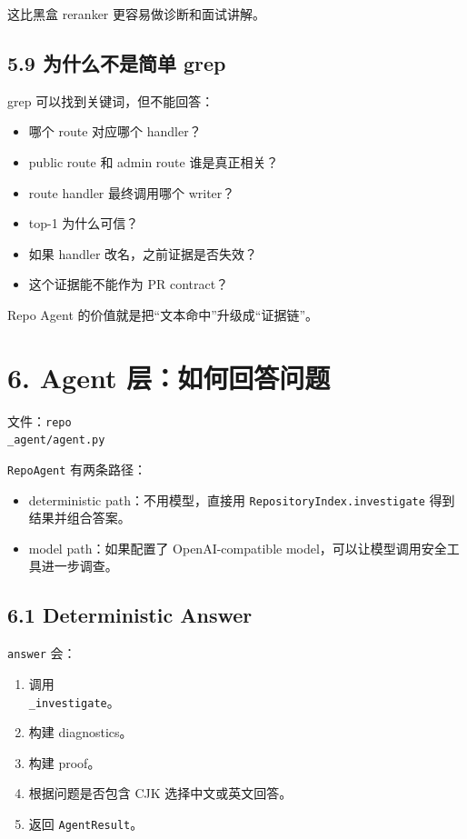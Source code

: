 \documentclass[UTF8,12pt,openany]{ctexbook}
\begin{document}
这比黑盒 reranker 更容易做诊断和面试讲解。\par

\subsection{5.9 为什么不是简单 grep}

grep 可以找到关键词，但不能回答：\par

\begin{itemize}
\item 哪个 route 对应哪个 handler？
\item public route 和 admin route 谁是真正相关？
\item route handler 最终调用哪个 writer？
\item top-1 为什么可信？
\item 如果 handler 改名，之前证据是否失效？
\item 这个证据能不能作为 PR contract？
\end{itemize}

Repo Agent 的价值就是把“文本命中”升级成“证据链”。\par

\section{6. Agent 层：如何回答问题}

文件：\texttt{repo\\_agent/agent.py}\par

\texttt{RepoAgent} 有两条路径：\par

\begin{itemize}
\item deterministic path：不用模型，直接用 \texttt{RepositoryIndex.investigate} 得到结果并组合答案。
\item model path：如果配置了 OpenAI-compatible model，可以让模型调用安全工具进一步调查。
\end{itemize}

\subsection{6.1 Deterministic Answer}

\texttt{answer} 会：\par

\begin{enumerate}
\item 调用 \texttt{\\_investigate}。
\item 构建 diagnostics。
\item 构建 proof。
\item 根据问题是否包含 CJK 选择中文或英文回答。
\item 返回 \texttt{AgentResult}。
\end{enumerate}
\end{document}
